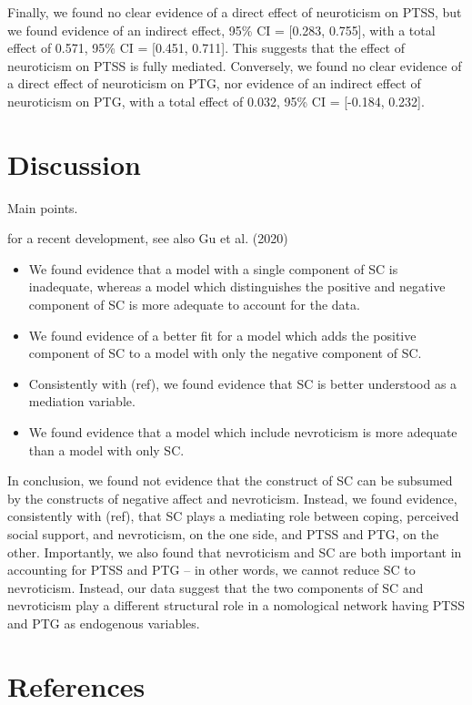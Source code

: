 \documentclass[
  english,
  man,floatsintext]{apa7}
\begin{document}
Finally, we found no clear evidence of a direct effect of neuroticism on PTSS, but we found evidence of an indirect effect, 95\% CI = {[}0.283, 0.755{]}, with a total effect of 0.571, 95\% CI = {[}0.451, 0.711{]}.
This suggests that the effect of neuroticism on PTSS is fully mediated.
Conversely, we found no clear evidence of a direct effect of neuroticism on PTG, nor evidence of an indirect effect of neuroticism on PTG, with a total effect of 0.032, 95\% CI = {[}-0.184, 0.232{]}.

\hypertarget{discussion}{%
\section{Discussion}\label{discussion}}

Main points.

for a recent development, see also Gu et al. (2020)

\begin{itemize}
\item
  We found evidence that a model with a single component of SC is inadequate, whereas a model which distinguishes the positive and negative component of SC is more adequate to account for the data.
\item
  We found evidence of a better fit for a model which adds the positive component of SC to a model with only the negative component of SC.
\item
  Consistently with (ref), we found evidence that SC is better understood as a mediation variable.
\item
  We found evidence that a model which include nevroticism is more adequate than a model with only SC.
\end{itemize}

In conclusion, we found not evidence that the construct of SC can be subsumed by the constructs of negative affect and nevroticism.
Instead, we found evidence, consistently with (ref), that SC plays a mediating role between coping, perceived social support, and nevroticism, on the one side, and PTSS and PTG, on the other.
Importantly, we also found that nevroticism and SC are both important in accounting for PTSS and PTG -- in other words, we cannot reduce SC to nevroticism.
Instead, our data suggest that the two components of SC and nevroticism play a different structural role in a nomological network having PTSS and PTG as endogenous variables.

\newpage

\hypertarget{references}{%
\section{References}\label{references}}
\end{document}

